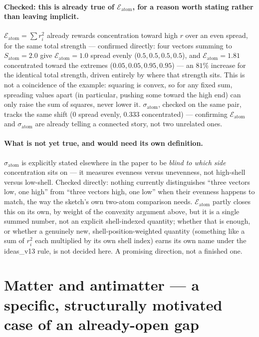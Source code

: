 \documentclass[11pt]{article}
\begin{document}
\paragraph{Checked: this is already true of $\mathcal{E}_{\text{atom}}$,
for a reason worth stating rather than leaving implicit.}
$\mathcal{E}_{\text{atom}}=\sum r_i^2$ already rewards concentration
toward high $r$ over an even spread, for the same total strength ---
confirmed directly: four vectors summing to $S_{\text{atom}}=2.0$
give $\mathcal{E}_{\text{atom}}=1.0$ spread evenly
($0.5,0.5,0.5,0.5$), and $\mathcal{E}_{\text{atom}}=1.81$ concentrated
toward the extremes ($0.05,0.05,0.95,0.95$) --- an $81\%$ increase
for the identical total strength, driven entirely by where that
strength sits. This is not a coincidence of the example: squaring is
convex, so for any fixed sum, spreading values apart (in particular,
pushing some toward the high end) can only raise the sum of squares,
never lower it. $\sigma_{\text{atom}}$, checked on the same pair,
tracks the same shift ($0$ spread evenly, $0.333$ concentrated) ---
confirming $\mathcal{E}_{\text{atom}}$ and $\sigma_{\text{atom}}$ are
already telling a connected story, not two unrelated ones.

\paragraph{What is not yet true, and would need its own definition.}
$\sigma_{\text{atom}}$ is explicitly stated elsewhere in the paper to
be \emph{blind to which side} concentration sits on --- it measures
evenness versus unevenness, not high-shell versus low-shell. Checked
directly: nothing currently distinguishes ``three vectors low, one
high'' from ``three vectors high, one low'' when their evenness
happens to match, the way the sketch's own two-atom comparison
needs. $\mathcal{E}_{\text{atom}}$ partly closes this on its own, by
weight of the convexity argument above, but it is a single summed
number, not an explicit shell-indexed quantity; whether that is
enough, or whether a genuinely new, shell-position-weighted
quantity (something like a sum of $r_i^2$ each multiplied by its own
shell index) earns its own name under the ideas\_v13 rule, is not
decided here. A promising direction, not a finished one.

\section{Matter and antimatter --- a specific, structurally motivated
case of an already-open gap}
\end{document}
